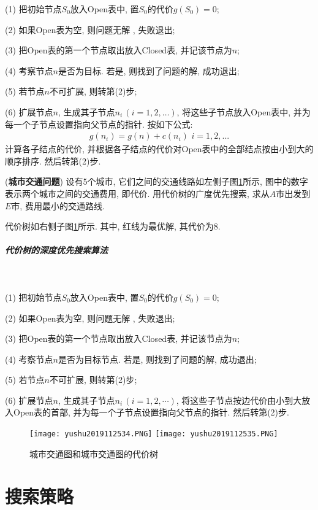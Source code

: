 (1) 把初始节点$S_0$放入Open表中, 置$S_0$的代价$g(S_0)=0$;

(2) 如果Open表为空, 则问题无解 , 失败退出;

(3) 把Open表的第一个节点取出放入Closed表, 并记该节点为$n$;

(4) 考察节点$n$是否为目标. 若是, 则找到了问题的解, 成功退出;

(5) 若节点$n$不可扩展, 则转第(2)步;

(6) 扩展节点$n$, 生成其子节点$n_i\,(i=1, 2, …)$, 将这些子节点放入Open表中, 并为每一个子节点设置指向父节点的指针. 按如下公式:
\begin{align}
  g(n_i)=g(n)+c(n_i)\,\,i=1,2,...
\end{align}
计算各子结点的代价, 并根据各子结点的代价对Open表中的全部结点按由小到大的顺序排序. 然后转第(2)步.
\begin{example}
(\textbf{城市交通问题}) 设有5个城市, 它们之间的交通线路如左侧子图\ref{AI32fig2019120234}所示, 图中的数字表示两个城市之间的交通费用, 即代价. 用代价树的广度优先搜索, 求从$A$市出发到$E$市, 费用最小的交通路线.
\end{example}
\begin{result}
代价树如右侧子图\ref{AI32fig2019120234}所示. 其中, 红线为最优解, 其代价为8.
\subparagraph{代价树的深度优先搜索算法}~{}

(1) 把初始节点$S_0$放入Open表中, 置$S_0$的代价$g(S_0)=0$;

(2) 如果Open表为空, 则问题无解 , 失败退出;

(3) 把Open表的第一个节点取出放入Closed表, 并记该节点为$n$;

(4) 考察节点$n$是否为目标节点. 若是, 则找到了问题的解, 成功退出;

(5) 若节点$n$不可扩展, 则转第(2)步;

(6) 扩展节点$n$, 生成其子节点$n_i\,(i=1, 2,\cdots)$, 将这些子节点按边代价由小到大放入Open表的首部, 并为每一个子节点设置指向父节点的指针. 然后转第(2)步.
\begin{figure}[H]
\centering
\texttt{[image: yushu2019112534.PNG]}
\texttt{[image: yushu2019112535.PNG]}
\caption{城市交通图和城市交通图的代价树 }
\label{AI32fig2019120234}
\end{figure}
\end{result}
\section{搜索策略}
